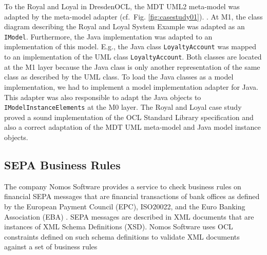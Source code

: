  To  the Royal and Loyal 
in DresdenOCL, the MDT UML2 meta-model was adapted by the
 meta-model adapter 
(cf.~Fig. \ref{fig:casestudy01}). . At M1, the class diagram describing the Royal and
Loyal System Example was adapted as an \texttt{IModel}. Furthermore, the 
Java implementation was adapted to an implementation of this model. E.g., the
Java class \texttt{LoyaltyAccount} was mapped to an implementation of the UML
class \texttt{LoyaltyAccount}.  Both
classes are located at the M1 layer because the Java class is only another representation 
of the same class as described by the UML class. 
To load the Java classes as a
model implementation, we had to implement a model implementation adapter for 
Java. This adapter was also responsible to adapt the Java objects to 
\texttt{IModelInstanceElements} at the M0 layer. The Royal and Loyal case 
study proved a sound implementation of the OCL Standard Library specification 
and also a correct adaptation of the MDT UML meta-model and Java model instance objects.



\subsection{SEPA Business Rules}

The company Nomos Software provides a service to check business rules on
financial SEPA  messages that are  financial transactions of bank offices as defined by the European
Payment Council (EPC), ISO20022, and the Euro Banking Association (EBA) \cite{spec:UNIFI,spec:EPC}. 
SEPA messages are described in XML documents that are instances of  XML
Schema Definitions (XSD). Nomos Software uses OCL constraints defined on such
schema definitions to validate XML documents against a set of business rules

